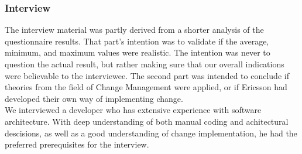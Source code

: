 \documentclass[final_report_innit.tex]{subfiles}
\begin{document}
\subsubsection{Interview}\label{approachInInt}
The interview material was partly derived from a shorter analysis of the questionnaire results. That part's intention was to validate if the average, minimum, and maximum values were realistic. The intention was never to question the actual result, but rather making sure that our overall indications were believable to the interviewee. The second part was intended to conclude if theories from the field of Change Management were applied, or if Ericsson had developed their own way of implementing change.
\\

We interviewed a developer who has extensive experience with software architecture. With deep understanding of both manual coding and achitectural descisions, as well as a good understanding of change implementation, he had the preferred prerequisites for the interview.
\end{document}
